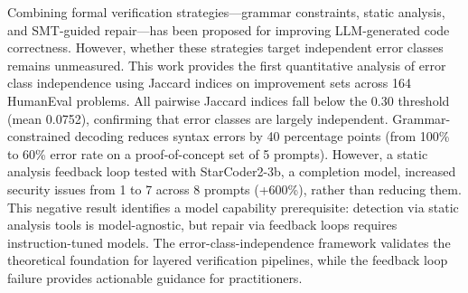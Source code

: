 
Combining formal verification strategies---grammar constraints, static analysis, and SMT-guided repair---has been proposed for improving LLM-generated code correctness. However, whether these strategies target independent error classes remains unmeasured. This work provides the first quantitative analysis of error class independence using Jaccard indices on improvement sets across 164 HumanEval problems. All pairwise Jaccard indices fall below the 0.30 threshold (mean 0.0752), confirming that error classes are largely independent. Grammar-constrained decoding reduces syntax errors by 40 percentage points (from 100\% to 60\% error rate on a proof-of-concept set of 5 prompts). However, a static analysis feedback loop tested with StarCoder2-3b, a completion model, increased security issues from 1 to 7 across 8 prompts (+600\%), rather than reducing them. This negative result identifies a model capability prerequisite: detection via static analysis tools is model-agnostic, but repair via feedback loops requires instruction-tuned models. The error-class-independence framework validates the theoretical foundation for layered verification pipelines, while the feedback loop failure provides actionable guidance for practitioners.
